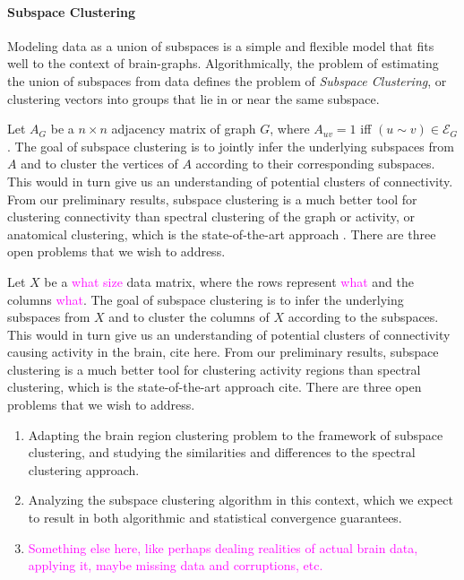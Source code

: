 \documentclass[times,11pt]{article} %
\newcommand{\laura}{\textcolor{magenta}}
\begin{document}

 

\newpage
\paragraph{Subspace Clustering}

Modeling data as a union of subspaces is a simple and flexible model that fits well to the context of brain-graphs.  Algorithmically, the problem of estimating the union of subspaces from data defines the problem of \emph{Subspace Clustering}, or clustering vectors into groups that lie in or near the same subspace. 


Let $A_G$ be a $n \times n$ adjacency matrix of graph $G$, where $A_{uv}=1$ iff $(u \sim v) \in \mathcal{E}_G$. 
The goal of subspace clustering is to jointly infer the underlying subspaces from $A$ and to cluster the vertices of $A$ according to their corresponding subspaces. This would in turn give us an understanding of potential clusters of connectivity. From our preliminary results, subspace clustering is a much better tool for clustering connectivity than spectral clustering of the graph or activity, or anatomical clustering, which is the state-of-the-art approach \cite{}. There are three open problems that we wish to address.


Let $X$ be a \laura{what size} data matrix, where the rows represent \laura{what} and the columns \laura{what}. 
The goal of subspace clustering is to infer the underlying subspaces from $X$ and to cluster the columns of $X$ according to the subspaces. This would in turn give us an understanding of potential clusters of connectivity causing activity in the brain, cite here. From our preliminary results, subspace clustering is a much better tool for clustering activity regions than spectral clustering, which is the state-of-the-art approach cite. There are three open problems that we wish to address. 

\begin{enumerate}
\item Adapting the brain region clustering problem to the framework of subspace clustering, and studying the similarities and differences to the spectral clustering approach.
\item Analyzing the subspace clustering algorithm in this context, which we expect to result in both algorithmic and statistical convergence guarantees.
\item \laura{Something else here, like perhaps dealing realities of actual brain data, applying it, maybe missing data and corruptions, etc.}
\end{enumerate}
\end{document}
